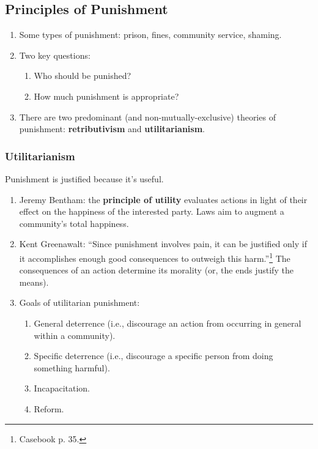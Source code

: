 \subsection{Principles of Punishment}

\begin{enumerate}
    \item Some types of punishment: prison, fines, community service, shaming.
    \item Two key questions:
    \begin{enumerate}
        \item Who should be punished?
        \item How much punishment is appropriate?
    \end{enumerate}
    \item There are two predominant (and non-mutually-exclusive) theories of 
    punishment: \textbf{retributivism} and \textbf{utilitarianism}.
\end{enumerate}

\subsubsection{Utilitarianism}

Punishment is justified because it's useful.

\begin{enumerate}
    \item Jeremy Bentham: the \textbf{principle of utility} evaluates actions 
    in light of their effect on the happiness of the interested party. Laws 
    aim to augment a community's total happiness.
    \item Kent Greenawalt: ``Since punishment involves pain, it can be 
    justified only if it accomplishes enough good consequences to outweigh 
    this harm.''\footnote{Casebook p. 35.} The consequences of an action 
    determine its morality (or, the ends justify the means).
    \item Goals of utilitarian punishment:
    \begin{enumerate}
        \item General deterrence (i.e., discourage an action from occurring in 
        general within a community).
        \item Specific deterrence (i.e., discourage a specific person from 
        doing something harmful).
        \item Incapacitation.
        \item Reform.
    \end{enumerate}
\end{enumerate}

